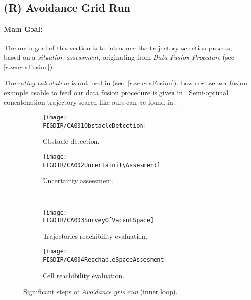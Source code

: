 \newpage
\subsection{(R) Avoidance Grid Run}\label{s:aviudabceGridRun}
\paragraph{Main Goal:} The main goal of this section is to introduce the trajectory selection process, based on a \emph{situation assessment}, originating from \emph{Data Fusion Procedure} (sec. \ref{s:sensorFusion}). 

\begin{note}
    The \emph{rating calculation} is outlined in (sec. \ref{s:sensorFusion}). Low cost sensor fusion example usable to feed our data fusion procedure is given in \cite{sabatini2013low}. Semi-optimal concatenation trajectory search  like ours can be found in \cite{shaw1998using}.
\end{note}

\begin{figure}[H]
\centering
    \begin{subfigure}{0.48\textwidth}
        \texttt{[image: \\FIGDIR/CA001ObstacleDetection]}
        \caption{Obstacle detection.}
        \label{fig:obstacleDetectionAvoidanceGrid}
    \end{subfigure}
    \begin{subfigure}{0.48\textwidth}
        \texttt{[image: \\FIGDIR/CA002UncertainityAssesment]} 
        \caption{Uncertainty assessment.}
        \label{fig:uncertainityAssesmentAvoidanceGrid}
    \end{subfigure}
    \\
    \begin{subfigure}{0.48\textwidth}
        \texttt{[image: \\FIGDIR/CA003SurveyOfVacantSpace]} 
        \caption{Trajectories reachibility evaluation.}
        \label{fig:trajectoriesSafetyEvaluationAvoidanceGrid}
    \end{subfigure}
    \begin{subfigure}{0.48\textwidth}
        \texttt{[image: \\FIGDIR/CA004ReachableSpaceAssesment]} 
        \caption{Cell reachibility evaluation.}
        \label{fig:reachibilityAssessmentAvoidanceGrid}
    \end{subfigure}
    \caption{Significant steps of \emph{Avoidance grid run} (inner loop).}
    \label{fig:significantStepsofAvoidanceGridRun}
\end{figure}

